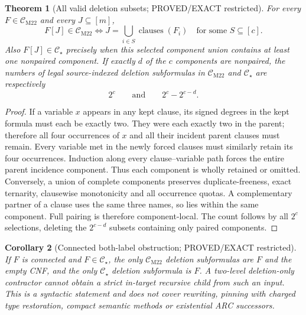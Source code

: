 \documentclass[11pt]{article}
\newtheorem{theorem}{Theorem}
\newtheorem{corollary}[theorem]{Corollary}
\newcommand{\CM}{\mathcal C_{\mathrm{M22}}}
\newcommand{\CS}{\mathcal C_{\star}}
\begin{document}
\begin{theorem}[All valid deletion subsets; PROVED/EXACT restricted]
For every $F\in\CM$ and every $J\subseteq[m]$,
\[
F[J]\in\CM\iff J=\bigcup_{i\in S}\operatorname{clauses}(F_i)
\quad\text{for some }S\subseteq[c].
\]
Also $F[J]\in\CS$ precisely when this selected component union contains at least one nonpaired component. If exactly $d$ of the $c$ components are nonpaired, the numbers of legal source-indexed deletion subformulas in $\CM$ and $\CS$ are respectively
\[
\boxed{2^c\qquad\text{and}\qquad2^c-2^{c-d}.}
\]
\end{theorem}
\begin{proof}
If a variable $x$ appears in any kept clause, its signed degrees in the kept formula must each be exactly two. They were each exactly two in the parent; therefore all four occurrences of $x$ and all their incident parent clauses must remain. Every variable met in the newly forced clauses must similarly retain its four occurrences. Induction along every clause--variable path forces the entire parent incidence component. Thus each component is wholly retained or omitted. Conversely, a union of complete components preserves duplicate-freeness, exact ternarity, clausewise monotonicity and all occurrence quotas. A complementary partner of a clause uses the same three names, so lies within the same component. Full pairing is therefore component-local. The count follows by all $2^c$ selections, deleting the $2^{c-d}$ subsets containing only paired components.
\end{proof}
\begin{corollary}[Connected both-label obstruction; PROVED/EXACT restricted]
If $F$ is connected and $F\in\CS$, the only $\CM$ deletion subformulas are $F$ and the empty CNF, and the only $\CS$ deletion subformula is $F$. A two-level deletion-only contractor cannot obtain a strict in-target recursive child from such an input. This is a syntactic statement and does not cover rewriting, pinning with charged type restoration, compact semantic methods or existential ARC successors.
\end{corollary}
\end{document}
